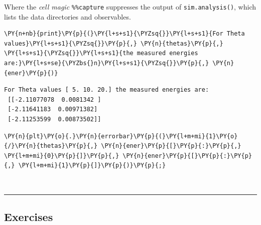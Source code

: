     Where the \emph{cell magic} \texttt{\%\%capture} suppresses the output
of \texttt{sim.analysis()}, which lists the data directories and
observables.

    \begin{tcolorbox}[breakable, size=fbox, boxrule=1pt, pad at break*=1mm,colback=cellbackground, colframe=cellborder]
\begin{Verbatim}[commandchars=\\\{\}]
\PY{n+nb}{print}\PY{p}{(}\PY{l+s+s1}{\PYZsq{}}\PY{l+s+s1}{For Theta values}\PY{l+s+s1}{\PYZsq{}}\PY{p}{,} \PY{n}{thetas}\PY{p}{,} \PY{l+s+s1}{\PYZsq{}}\PY{l+s+s1}{the measured energies are:}\PY{l+s+se}{\PYZbs{}n}\PY{l+s+s1}{\PYZsq{}}\PY{p}{,} \PY{n}{ener}\PY{p}{)}
\end{Verbatim}
\end{tcolorbox}

    \begin{Verbatim}[commandchars=\\\{\}]
For Theta values [ 5. 10. 20.] the measured energies are:
 [[-2.11077078  0.0081342 ]
 [-2.11641183  0.00971382]
 [-2.11253599  0.00873502]]
    \end{Verbatim}

    \begin{tcolorbox}[breakable, size=fbox, boxrule=1pt, pad at break*=1mm,colback=cellbackground, colframe=cellborder]
\begin{Verbatim}[commandchars=\\\{\}]
\PY{n}{plt}\PY{o}{.}\PY{n}{errorbar}\PY{p}{(}\PY{l+m+mi}{1}\PY{o}{/}\PY{n}{thetas}\PY{p}{,} \PY{n}{ener}\PY{p}{[}\PY{p}{:}\PY{p}{,} \PY{l+m+mi}{0}\PY{p}{]}\PY{p}{,} \PY{n}{ener}\PY{p}{[}\PY{p}{:}\PY{p}{,} \PY{l+m+mi}{1}\PY{p}{]}\PY{p}{)}\PY{p}{;}
\end{Verbatim}
\end{tcolorbox}

    \begin{center}
    \end{center}
    { \hspace*{\fill} \\}
    
    \begin{center}\rule{0.5\linewidth}{0.5pt}\end{center}

\hypertarget{exercises}{%
\subsection{Exercises}\label{exercises}}

